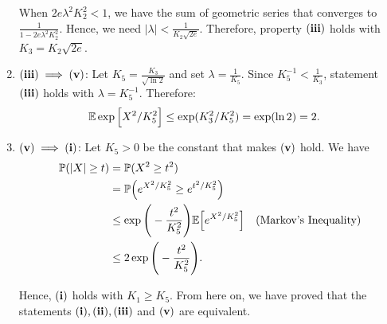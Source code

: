 \begin{proof*}
\begin{enumerate}
		\noindent When $2e\lambda^2K_2^2 < 1$, we have the sum of geometric series that converges to $\frac{1}{1 - 2e\lambda^2K_2^2}$. Hence, we need $|\lambda| < \frac{1}{K_2\sqrt{2e}}$. Therefore, property $\bf (iii)$ holds with $K_3 = K_2\sqrt{2e}$.

		\item ${\bf (iii)}\implies {\bf (v)}$: Let $K_5=\frac{K_3}{\sqrt{\ln 2}}$ and set $\lambda=\frac{1}{K_5}$. Since $K_5^{-1} < \frac{1}{K_3}$, statement $\bf (iii)$ holds with $\lambda=K_5^{-1}$. Therefore:
		\begin{align*}
			\mathbb{E}\exp\Big[ X^2/K_5^2 \Big] &\le \exp(K_3^2/K_5^2) = \exp(\ln 2) = 2.
		\end{align*} 

		\item ${\bf (v)}\implies{\bf (i)}$: Let $K_5>0$ be the constant that makes $\bf (v)$ hold. We have
		\begin{align*}
			\mathbb{P}(|X| \ge t) &= \mathbb{P}(X^2\ge t^2) \\
				&= \mathbb{P}\Big( e^{X^2/K_5^2} \ge e^{t^2/K_5^2} \Big) \\
				&\le \exp\Bigg( -\frac{t^2}{K_5^2} \Bigg)\mathbb{E}\Big[ e^{X^2/K_5^2} \Big] \quad \text{(Markov's Inequality)} \\
				&\le 2\exp\Bigg( -\frac{t^2}{K_5^2} \Bigg).
		\end{align*} 

		\noindent Hence, $\bf (i)$ holds with $K_1\ge K_5$. From here on, we have proved that the statements $\bf (i), (ii), (iii)$ and $\bf (v)$ are equivalent. 
	\end{enumerate} 
\end{proof*} 
